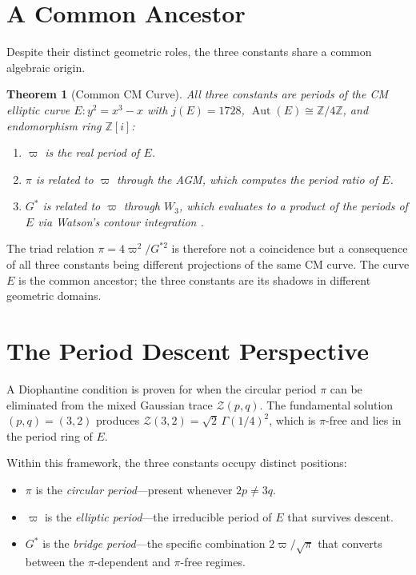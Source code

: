 \documentclass[12pt]{article}
\newtheorem{theorem}{Theorem}[section]
\theoremstyle{definition}
\theoremstyle{remark}
\begin{document}
\section{A Common Ancestor}
\label{sec:ancestor}

Despite their distinct geometric roles, the three constants share a common algebraic origin.

\begin{theorem}[Common CM Curve]
\label{thm:common}
All three constants are periods of the CM elliptic curve $E\!: y^2 = x^3 - x$ with $j(E) = 1728$, $\operatorname{Aut}(E) \cong \mathbb{Z}/4\mathbb{Z}$, and endomorphism ring $\mathbb{Z}[i]$:
\begin{enumerate}[nosep]
    \item $\varpi$ is the real period of $E$.
    \item $\pi$ is related to $\varpi$ through the AGM, which computes the period ratio of $E$.
    \item $G^*$ is related to $\varpi$ through $W_3$, which evaluates to a product of the periods of $E$ via Watson's contour integration \cite{watson1939}.
\end{enumerate}
\end{theorem}

The triad relation $\pi = 4\varpi^2/G^{*2}$ is therefore not a coincidence but a consequence of all three constants being different projections of the same CM curve. The curve $E$ is the common ancestor; the three constants are its shadows in different geometric domains.

\section{The Period Descent Perspective}
\label{sec:descent}

A Diophantine condition is proven for when the circular period $\pi$ can be eliminated from the mixed Gaussian trace $\mathcal{Z}(p,q)$. The fundamental solution $(p,q) = (3,2)$ produces $\mathcal{Z}(3,2) = \sqrt{2}\,\Gamma(1/4)^2$, which is $\pi$-free and lies in the period ring of $E$.

Within this framework, the three constants occupy distinct positions:
\begin{itemize}[nosep]
    \item $\pi$ is the \emph{circular period}---present whenever $2p \neq 3q$.
    \item $\varpi$ is the \emph{elliptic period}---the irreducible period of $E$ that survives descent.
    \item $G^*$ is the \emph{bridge period}---the specific combination $2\varpi/\sqrt{\pi}$ that converts between the $\pi$-dependent and $\pi$-free regimes.
\end{itemize}
\end{document}
